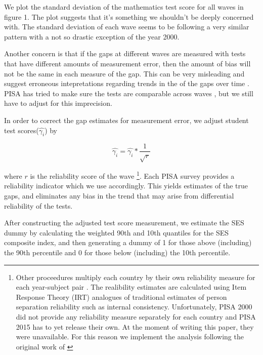 \documentclass[11pt, a4paper]{article}\usepackage[]{graphicx}\usepackage[]{color}
\begin{document}
We plot the standard deviation of the mathematics test score for all waves in figure 1. The plot suggests that it's something we shouldn't be deeply concerned with. The standard deviation of each wave seems to be following a very similar pattern with a not so drastic exception of the year 2000.

Another concern is that if the gaps at different waves are measured with tests that have different amounts of measurement error, then the amount of bias will not be the same in each measure of the gap. This can be very misleading and suggest erroneous intepretations regarding trends in the of the gaps over time \citep{reardon2011}. PISA has tried to make sure the tests are comparable across waves \citep{pisa2012_technical}, but we still have to adjust for this imprecision.

In order to correct the gap estimates for measurement error, we adjust student test scores(\begin{math} \hat{\gamma_i} \end{math}) by

\begin{equation}
\hat{\gamma_i} = \hat{\gamma_i} * \frac{1}{\sqrt{r}}
\end{equation}

where \begin{math}r\end{math} is the reliability score of the wave \footnote{Other proceedures multiply each country by their own reliability measure for each year-subject pair \citep{anna2016_global}. The realibility estimates are calculated using Item Response Theory (IRT) analogues of traditional estimates of person separation reliability such as internal consistency. Unfortunately, PISA 2000 did not provide any reliability measure separately for each country and PISA 2015 has to yet release their own. At the moment of writing this paper, they were unavailable. For this reason we implement the analysis following the original work of \citet{reardon2011}}. Each PISA survey provides a reliability indicator which we use accordingly. This yields estimates of the true gaps, and eliminates any bias in the trend that may arise from differential reliability of the tests.

After constructing the adjusted test score measurement, we estimate the SES dummy by calculating the weighted 90th and 10th quantiles for the SES composite index, and then generating a dummy of 1 for those above (including) the 90th percentile and 0 for those below (including) the 10th percentile.
\end{document}
